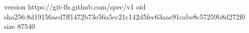 version https://git-lfs.github.com/spec/v1
oid sha256:8d19156aed7ff1472b73e56a5cc21c142d5fec63aae91cabe8c57259b8d272f0
size 87540
